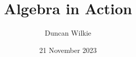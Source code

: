 \documentclass{book}
\title{Algebra in Action}
\author{Duncan Wilkie}
\date{21 November 2023}
\begin{document}
\maketitle





\tableofcontents










\appendix
\noappendicestocpagenum
\addappheadtotoc






\end{document}
